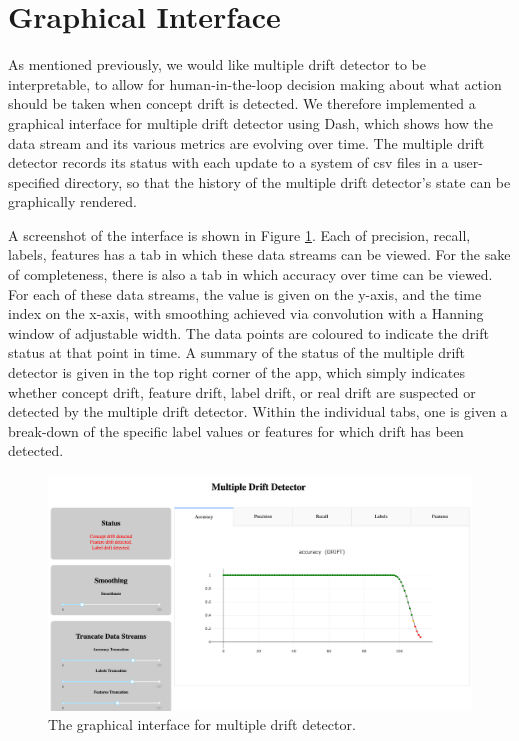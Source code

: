 
\section{Graphical Interface} \label{mdd:graphics}

As mentioned previously, we would like multiple drift detector to be interpretable, to allow for human-in-the-loop decision making about what action should be taken when concept drift is detected. We therefore implemented a graphical interface for multiple drift detector using Dash, which shows how the data stream and its various metrics are evolving over time. The multiple drift detector records its status with each update to a system of csv files in a user-specified directory, so that the history of the multiple drift detector's state can be graphically rendered.

A screenshot of the interface is shown in Figure \ref{fig:dash_app}. Each of precision, recall, labels, features has a tab in which these data streams can be viewed. For the sake of completeness, there is also a tab in which accuracy over time can be viewed. For each of these data streams, the value is given on the y-axis, and the time index on the x-axis, with smoothing achieved via convolution with a Hanning window of adjustable width. The data points are coloured to indicate the drift status at that point in time. A summary of the status of the multiple drift detector is given in the top right corner of the app, which simply indicates whether concept drift, feature drift, label drift, or real drift are suspected or detected by the multiple drift detector. Within the individual tabs, one is given a break-down of the specific label values or features for which drift has been detected.

\begin{figure}
    \centering
    \includegraphics[width=\columnwidth]{images/dash_app.png}
    \caption{The graphical interface for multiple drift detector.}
    \label{fig:dash_app}
\end{figure}

